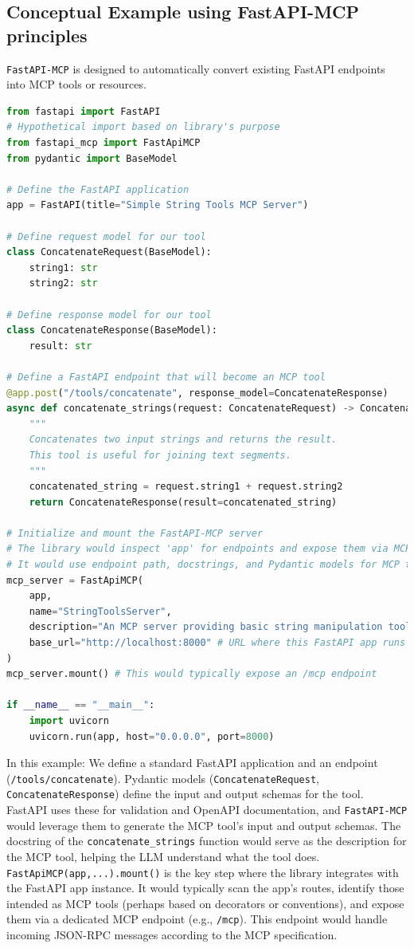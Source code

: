 \subsection*{Conceptual Example using FastAPI-MCP principles}
\texttt{FastAPI-MCP} is designed to automatically convert existing FastAPI endpoints into MCP tools or resources.
\begin{lstlisting}[language=Python]
from fastapi import FastAPI
# Hypothetical import based on library's purpose
from fastapi_mcp import FastApiMCP 
from pydantic import BaseModel

# Define the FastAPI application
app = FastAPI(title="Simple String Tools MCP Server")

# Define request model for our tool
class ConcatenateRequest(BaseModel):
    string1: str
    string2: str

# Define response model for our tool
class ConcatenateResponse(BaseModel):
    result: str

# Define a FastAPI endpoint that will become an MCP tool
@app.post("/tools/concatenate", response_model=ConcatenateResponse)
async def concatenate_strings(request: ConcatenateRequest) -> ConcatenateResponse:
    """
    Concatenates two input strings and returns the result.
    This tool is useful for joining text segments.
    """
    concatenated_string = request.string1 + request.string2
    return ConcatenateResponse(result=concatenated_string)

# Initialize and mount the FastAPI-MCP server
# The library would inspect 'app' for endpoints and expose them via MCP.
# It would use endpoint path, docstrings, and Pydantic models for MCP tool schema.
mcp_server = FastApiMCP(
    app,
    name="StringToolsServer",
    description="An MCP server providing basic string manipulation tools.",
    base_url="http://localhost:8000" # URL where this FastAPI app runs
)
mcp_server.mount() # This would typically expose an /mcp endpoint

if __name__ == "__main__":
    import uvicorn
    uvicorn.run(app, host="0.0.0.0", port=8000)
\end{lstlisting}
In this example:
We define a standard FastAPI application and an endpoint (\texttt{/tools/concatenate}). Pydantic models (\texttt{ConcatenateRequest}, 
\texttt{ConcatenateResponse}) define the input and output schemas for the tool. FastAPI uses these for validation and OpenAPI documentation, 
and \texttt{FastAPI-MCP} would leverage them to generate the MCP tool's input and output schemas. The docstring of the \texttt{concatenate\_strings} 
function would serve as the description for the MCP tool, helping the LLM understand what the tool does. \texttt{FastApiMCP(app,...).mount()} is 
the key step where the library integrates with the FastAPI app instance. It would typically scan the app's routes, identify those intended as 
MCP tools (perhaps based on decorators or conventions), and expose them via a dedicated MCP endpoint (e.g., \texttt{/mcp}). 
This endpoint would handle incoming JSON-RPC messages according to the MCP specification.

